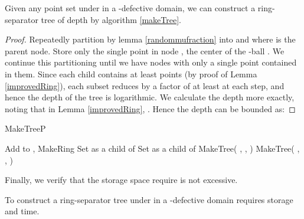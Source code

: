 \documentclass[11pt]{myclass}
\begin{document}
\begin{lemma}\label{ringsep}
Given any point set  under  in a -defective domain, we can construct a  ring-separator tree  of depth  by algorithm \ref{makeTree}.
\end{lemma}

\begin{proof}
Repeatedly partition  by lemma \ref{randommufraction} into  and  where  is the parent node. Store only the single point  in node , the center of the -ball . 
We continue this partitioning until we have nodes with only a single point contained in them.
Since each child contains at least  points (by proof of Lemma \ref{improvedRing}), each subset reduces by a factor of at least  at each step, 
and hence the depth of the tree is logarithmic. We calculate the depth more exactly, 
noting that in Lemma \ref{improvedRing}, .
Hence the depth  can be bounded as:

\end{proof}

\begin{algorithm}
  \caption{MakeTreeP}
  \begin{algorithmic}
  \STATE {}
  	\STATE Add  to 
    \STATE ,   MakeRing 
	\STATE Set  as a child of 
	\STATE Set  as a child of 
	\STATE MakeTree( , , )
	\STATE MakeTree( , , )
  \end{algorithmic}
  \label{makeTree}
\end{algorithm}


Finally, we verify that the storage space require is not excessive.
\begin{lemma}\label{ringstorage}
To construct a  ring-separator tree under  in a -defective domain requires  storage and  time.
\end{lemma}
\end{document}
